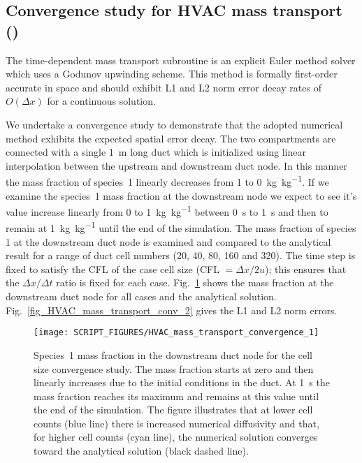\documentclass[11pt]{book}
\begin{document}
\subsection{Convergence study for HVAC mass transport (\texorpdfstring{}{HVAC\_mass\_transport\_conv\_x})}
\label{HVAC_mass_transport_conv_0020}
\label{HVAC_mass_transport_conv_0040}
\label{HVAC_mass_transport_conv_0080}
\label{HVAC_mass_transport_conv_0160}
\label{HVAC_mass_transport_conv_0320}
The time-dependent mass transport subroutine is an explicit Euler method solver which uses a Godunov upwinding scheme. This method is formally first-order accurate in space and should exhibit L1 and L2 norm error decay rates of \(O(\Delta x)\) for a continuous solution.

We undertake a convergence study to demonstrate that the adopted numerical method exhibits the expected spatial error decay. The two compartments are connected with a single \SI{1}{\meter} long duct which is initialized using linear interpolation between the upstream and downstream duct node. In this manner the mass fraction of species~1 linearly decreases from \num{1} to \SI[per-mode=symbol]{0}{\kilogram\per\kilogram}. If we examine the species~1 mass fraction at the downstream node we expect to see it's value increase linearly from \num{0} to \SI[per-mode=symbol]{1}{\kilogram\per\kilogram} between \SI{0}{\second} to \SI{1}{\second} and then to remain at \SI[per-mode=symbol]{1}{\kilogram\per\kilogram} until the end of the simulation. The mass fraction of species 1 at the downstream duct node is examined and compared to the analytical result for a range of duct cell numbers (20, 40, 80, 160 and 320). The time step is fixed to satisfy the CFL of the case cell size (CFL \(= \Delta x/2u\)); this ensures that the \(\Delta x/\Delta t\) ratio is fixed for each case. Fig.~\ref{fig_HVAC_mass_transport_conv_1} shows the mass fraction at the downstream duct node for all cases and the analytical solution. Fig.~\ref{fig_HVAC_mass_transport_conv_2} gives the L1 and L2 norm errors.

\begin{figure}[ht]
\centering
\texttt{[image: SCRIPT\_FIGURES/HVAC\_mass\_transport\_convergence\_1]}
\caption[ test case result]{Species~\num{1} mass fraction in the downstream duct node for the cell size convergence study. The mass fraction starts at zero and then linearly increases due to the initial conditions in the duct. At \SI{1}{\second} the mass fraction reaches its maximum and remains at this value until the end of the simulation. The figure illustrates that at lower cell counts (blue line) there is increased numerical diffusivity and that, for higher cell counts (cyan line), the numerical solution converges toward the analytical solution (black dashed line).}
\label{fig_HVAC_mass_transport_conv_1}
\end{figure}
\end{document}
